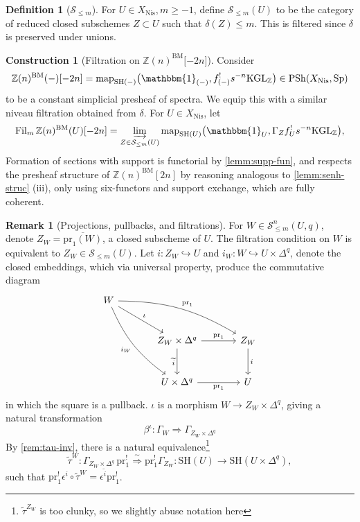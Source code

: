 \documentclass[11pt, twoside]{article}
\numberwithin{equation}{section}
\theoremstyle{definition}
\newtheorem{definition}[equation]{Definition}
\newtheorem{construction}[equation]{Construction}
\newtheorem{remark}[equation]{Remark}
\newcommand{\bb}[1]{\mathbb{#1}}
\newcommand{\colim}{\varinjlim}
\newcommand{\pr}{\mathrm{pr}}
\newcommand{\map}{\mathrm{map}}
\newcommand{\fil}{\mathrm{Fil}}
\newcommand{\Kgl}{\mathrm{KGL}}
\newcommand{\sh}{\mathrm{SH}}
\newcommand{\Sp}{\mathrm{Sp}}
\newcommand{\bm}{\mathrm{BM}}
\newcommand{\psh}{\mathrm{PSh}}
\newcommand{\nis}{\mathrm{Nis}}
\begin{document}
\begin{definition}[\(\mathcal{S}_{\leq m}\)]
For \(U \in X_\nis, m \geq - 1\), define \(\mathcal{S}_{\leq m}(U)\) to be the category of reduced closed subschemes \(Z \subset U\) such that \(\delta(Z) \leq m\). This is filtered since \(\delta\) is preserved under unions. 
\end{definition}

\begin{construction}[Filtration on \(\bb{Z}(n)^\bm \lbrack -2n \rbrack\)]\label{con:fil-ZBM}
Consider 
\[\bb{Z}(n)^\bm( -)\lbrack -2n \rbrack = \map_{\sh( -)}\big(\mathbbm{1}_{( -)}, f_{( -)}^! s^{- n} \Kgl_\bb{Z}\big) \in \psh(X_\nis, \Sp)\]
to be a constant simplicial presheaf of spectra. We equip this with a similar niveau filtration obtained from \(\delta\). For \(U \in X_\nis\), let 
\[\fil_m \, \bb{Z}(n)^\bm(U)\lbrack -2n \rbrack = \colim_{Z \in \mathcal{S}_{\leq m}(U)} \map_{\sh(U)}\big(\mathbbm{1}_U, \Gamma_Z f_U^! s^{- n}\Kgl_\bb{Z}\big),\]
Formation of sections with support is functorial by \ref{lemm:supp-fun}, and respects the presheaf structure of \(\bb{Z}(n)^\bm[2n]\) by reasoning analogous to \ref{lemm:senh-struc} (iii), only using six-functors and support exchange, which are fully coherent. 
\end{construction}

\begin{remark}[Projections, pullbacks, and filtrations]\label{rem:proj-pull-fil}
For \(W \in \mathcal{S}_{\leq m}^n(U, q)\), denote \(Z_W = \overline{\pr_1(W)}\), a closed subscheme of \(U\). The filtration condition on \(W\) is equivalent to \(Z_W \in \mathcal{S}_{\leq m}(U)\). Let \(i \colon Z_W \hookrightarrow U\) and \(i_W \colon W \hookrightarrow U \times \Delta^q\), 
denote the closed embeddings, which via universal property, produce the commutative diagram 
\[\begin{tikzcd} [row sep = large, column sep = large] W \ar[ddr, "i_W", bend right = 15, swap] \ar[dr, "\iota"] \ar[drr, "\pr_1", bend left = 15]\\
& Z_W \times \Delta^q \ar[d, "\tilde{i}", swap] \ar[r, "\pr_1"] & Z_W \ar[d, "i"]\\
& U \times \Delta^q \ar[r, "\pr_1", swap] & U
\end{tikzcd}\]
in which the square is a pullback. \(\iota\) is a morphism \(W \to Z_W \times \Delta^q\), giving a natural transformation
\[\beta^\iota \colon \Gamma_W \Longrightarrow \Gamma_{Z_W \times \Delta^q}\]
By \ref{rem:tau-inv}, there is a natural equivalence\footnote{\(\tilde{\tau}^{Z_W}\) is too clunky, so we slightly abuse notation here} 
\[\tilde{\tau}^W \colon \Gamma_{Z_W \times \Delta^q} \, \pr_1^! \stackrel{\sim} \Longrightarrow \pr_1^! \Gamma_{Z_W} \colon \sh(U) \to \sh(U \times \Delta^q),\]
such that \(\pr_1^!\epsilon^i \circ \tilde{\tau}^W = \epsilon^{\tilde{i}} \pr_1^!\).
\end{remark}
\end{document}
